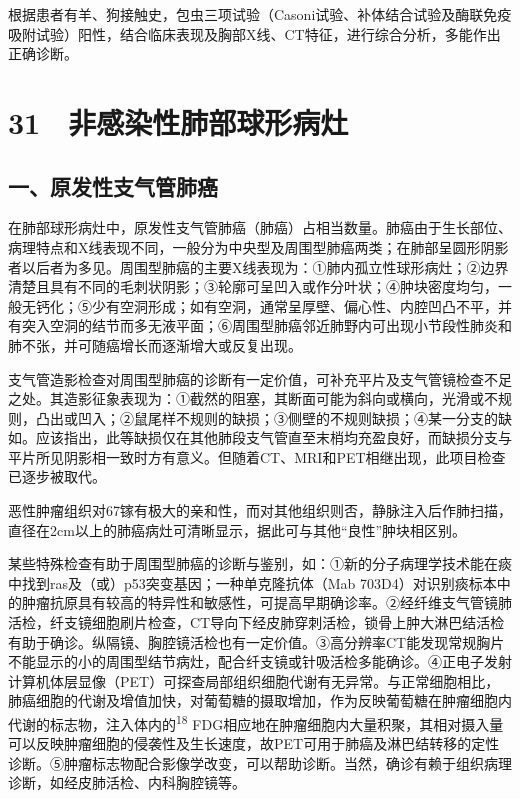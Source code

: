 根据患者有羊、狗接触史，包虫三项试验（Casoni试验、补体结合试验及酶联免疫吸附试验）阳性，结合临床表现及胸部X线、CT特征，进行综合分析，多能作出正确诊断。

\protect\hypertarget{text00090.html}{}{}

\section{31　非感染性肺部球形病灶}

\subsection{一、原发性支气管肺癌}

在肺部球形病灶中，原发性支气管肺癌（肺癌）占相当数量。肺癌由于生长部位、病理特点和X线表现不同，一般分为中央型及周围型肺癌两类；在肺部呈圆形阴影者以后者为多见。周围型肺癌的主要X线表现为：①肺内孤立性球形病灶；②边界清楚且具有不同的毛刺状阴影；③轮廓可呈凹入或作分叶状；④肿块密度均匀，一般无钙化；⑤少有空洞形成；如有空洞，通常呈厚壁、偏心性、内腔凹凸不平，并有突入空洞的结节而多无液平面；⑥周围型肺癌邻近肺野内可出现小节段性肺炎和肺不张，并可随癌增长而逐渐增大或反复出现。

支气管造影检查对周围型肺癌的诊断有一定价值，可补充平片及支气管镜检查不足之处。其造影征象表现为：①截然的阻塞，其断面可能为斜向或横向，光滑或不规则，凸出或凹入；②鼠尾样不规则的缺损；③侧壁的不规则缺损；④某一分支的缺如。应该指出，此等缺损仅在其他肺段支气管直至末梢均充盈良好，而缺损分支与平片所见阴影相一致时方有意义。但随着CT、MRI和PET相继出现，此项目检查已逐步被取代。

恶性肿瘤组织对67镓有极大的亲和性，而对其他组织则否，静脉注入后作肺扫描，直径在2cm以上的肺癌病灶可清晰显示，据此可与其他“良性”肿块相区别。

某些特殊检查有助于周围型肺癌的诊断与鉴别，如：①新的分子病理学技术能在痰中找到ras及（或）p53突变基因；一种单克隆抗体（Mab
703D4）对识别痰标本中的肿瘤抗原具有较高的特异性和敏感性，可提高早期确诊率。②经纤维支气管镜肺活检，纤支镜细胞刷片检查，CT导向下经皮肺穿刺活检，锁骨上肿大淋巴结活检有助于确诊。纵隔镜、胸腔镜活检也有一定价值。③高分辨率CT能发现常规胸片不能显示的小的周围型结节病灶，配合纤支镜或针吸活检多能确诊。④正电子发射计算机体层显像（PET）可探查局部组织细胞代谢有无异常。与正常细胞相比，肺癌细胞的代谢及增值加快，对葡萄糖的摄取增加，作为反映葡萄糖在肿瘤细胞内代谢的标志物，注入体内的\textsuperscript{18}
FDG相应地在肿瘤细胞内大量积聚，其相对摄入量可以反映肿瘤细胞的侵袭性及生长速度，故PET可用于肺癌及淋巴结转移的定性诊断。⑤肿瘤标志物配合影像学改变，可以帮助诊断。当然，确诊有赖于组织病理诊断，如经皮肺活检、内科胸腔镜等。

